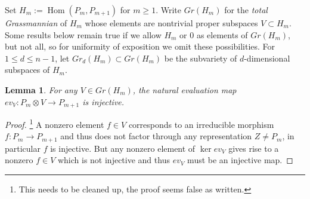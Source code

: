 \documentclass{amsart}
\newtheorem{lemma}[theorem]{Lemma}
\newcommand{\CC}{\mathbb{C}}
\newcommand{\Hom}{\operatorname{Hom}}
\begin{document}
Set $H_m:=\Hom(P_m,P_{m+1})$ for $m\ge1$. %
Write $Gr(H_m)$ for the \emph{total Grassmannian} of $H_m$ whose elements are nontrivial proper subspaces $V\subset H_m$.
Some results below remain true if we allow $H_m$ or $0$ as elements of $Gr(H_m)$, but not all, so for uniformity of exposition we omit these possibilities.
For $1\le d\le n-1$, let $Gr_d(H_m)\subset Gr(H_m)$ be the subvariety of $d$-dimensional subspaces of $H_m$.
%
%
\begin{lemma}
  \label{le:injective evaluation maps}
  For any $V\in Gr(H_m)$, the natural evaluation map $ev_V:P_m\otimes V\to P_{m+1}$ is injective.
\end{lemma}
\begin{proof}
  \footnote{This needs to be cleaned up, the proof seems false as written.}
  A nonzero element $f\in V$ corresponds to an irreducible morphism $f:P_m\to P_{m+1}$ and thus does not factor through any representation $Z\ne P_m$, in particular $f$ is injective.
  But any nonzero element of $\ker ev_V$ gives rise to a nonzero $f\in V$ which is not injective and thus $ev_V$ must be an injective map.
\end{proof}
\end{document}
